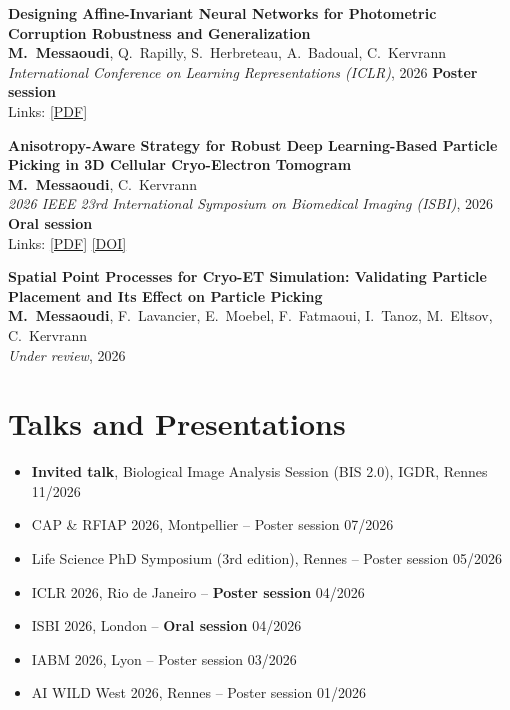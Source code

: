 \documentclass[10pt,a4paper]{article}
\newcommand{\talk}[2]{\item #2 \hfill #1}
\begin{document}
\begin{enumerate}[label={[\arabic*]}, leftmargin=2.2em, itemsep=6pt, topsep=3pt, parsep=0pt]

\item {\bfseries Designing Affine-Invariant Neural Networks for Photometric Corruption Robustness and Generalization}\\[1pt]
\textbf{M.~Messaoudi}, Q.~Rapilly, S.~Herbreteau, A.~Badoual, C.~Kervrann\\[1pt]
\textit{International Conference on Learning Representations (ICLR)}, 2026 \hfill {\small\textcolor{accent}{\textbf{Poster session}}}\\[1pt]
{\small Links: \href{https://proceedings.iclr.cc/paper_files/paper/2026/file/c9c54ac0dd5e942b99b2b51c297544fd-Paper-Conference.pdf}{[PDF]}}

\item {\bfseries Anisotropy-Aware Strategy for Robust Deep Learning-Based Particle Picking in 3D Cellular Cryo-Electron Tomogram}\\[1pt]
\textbf{M.~Messaoudi}, C.~Kervrann\\[1pt]
\textit{2026 IEEE 23rd International Symposium on Biomedical Imaging (ISBI)}, 2026 \hfill {\small\textcolor{accent}{\textbf{Oral session}}}\\[1pt]
{\small Links: \href{https://ieeexplore.ieee.org/abstract/document/11515672}{[PDF]} \href{https://doi.org/10.1109/ISBI61048.2026.11515672}{[DOI]}}

\item {\bfseries Spatial Point Processes for Cryo-ET Simulation: Validating Particle Placement and Its Effect on Particle Picking}\\[1pt]
\textbf{M.~Messaoudi}, F.~Lavancier, E.~Moebel, F.~Fatmaoui, I.~Tanoz, M.~Eltsov, C.~Kervrann\\[1pt]
\textit{Under review}, 2026

\end{enumerate}

\newpage
\section{Talks and Presentations}

\begin{itemize}[label={}, leftmargin=0pt, itemsep=3pt]
  \talk{11/2026}{\textbf{Invited talk}, Biological Image Analysis Session (BIS 2.0), IGDR, Rennes}
  \talk{07/2026}{CAP \& RFIAP 2026, Montpellier -- Poster session}
  \talk{05/2026}{Life Science PhD Symposium (3rd edition), Rennes -- Poster session}
  \talk{04/2026}{ICLR 2026, Rio de Janeiro -- \textbf{Poster session}}
  \talk{04/2026}{ISBI 2026, London -- \textbf{Oral session}}
  \talk{03/2026}{IABM 2026, Lyon -- Poster session}
  \talk{01/2026}{AI WILD West 2026, Rennes -- Poster session}
\end{itemize}
\end{document}

